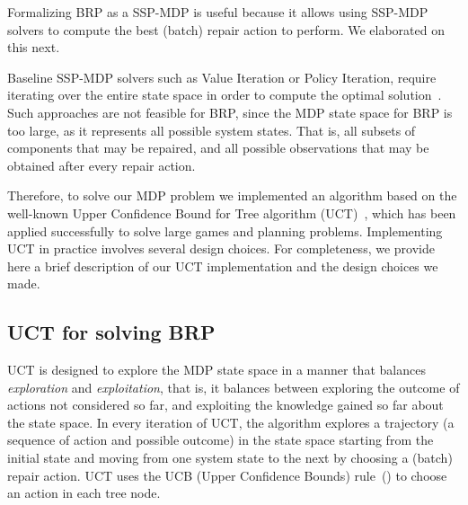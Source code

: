 \documentclass[review]{elsarticle}
\begin{document}
  \begin{figure}{}
\caption{%
}
\label{fig:MDP_example}
\end{figure}

 
 
Formalizing BRP as a SSP-MDP is useful because it allows using SSP-MDP solvers to compute the best (batch) repair action to perform. We elaborated on this next. 
 
Baseline SSP-MDP solvers such as Value Iteration or Policy Iteration, require iterating over the entire state space in order to compute the optimal solution~\cite{russell2010artificialIntelligence}. 
Such approaches are not feasible for BRP, since the MDP state space for BRP is too large, as it represents all possible system states. That is, all subsets of components that may be repaired, and all possible observations that may be obtained after every repair action. 

Therefore, to solve our MDP problem we implemented an algorithm based on
the well-known Upper Confidence Bound for Tree algorithm (UCT)~\cite{kocsis2006bandit}, which has been applied successfully to solve large games and planning problems. Implementing UCT in practice involves several design choices. For completeness, we provide here a brief description of our UCT implementation and the design choices we made. 

\subsection{UCT for solving BRP}
UCT is designed to explore the MDP state space in a manner that balances \emph{exploration} and \emph{exploitation}, that is, it balances between exploring the outcome of actions not considered so far, and exploiting the knowledge gained so far about the state space. %
In every iteration of UCT, the algorithm explores a trajectory (a sequence of action and possible outcome) in the state space starting from the initial state and moving from one system state to the next by choosing a (batch) repair action. UCT uses the UCB (Upper Confidence Bounds) rule~(\cite{auer2002finite}) to choose an action in each tree node. 
\end{document}
